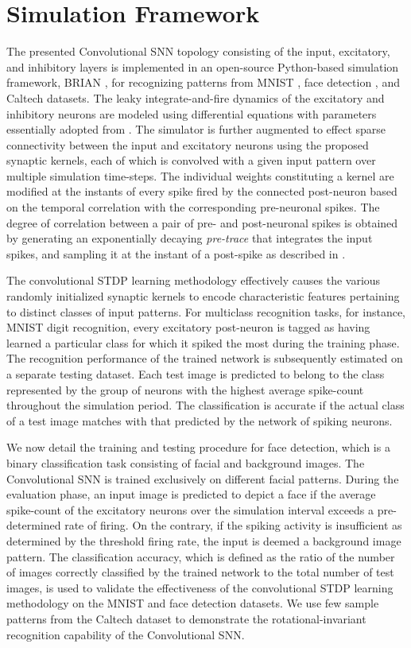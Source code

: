 \documentclass[journal, onecolumn]{IEEEtran}
\begin{document}
\section*{\large\bf{Simulation Framework}}
The presented Convolutional SNN topology consisting of the input, excitatory, and inhibitory layers is implemented in an open-source Python-based simulation framework, BRIAN \cite{goodman2008brian}, for recognizing patterns from MNIST \cite{lecun1998mnist}, face detection \cite{YUV_FACE}, and Caltech \cite{fei2007learning} datasets. The leaky integrate-and-fire dynamics of the excitatory and inhibitory neurons are modeled using differential equations with parameters essentially adopted from \cite{jug2012competition}. The simulator is further augmented to effect sparse connectivity between the input and excitatory neurons using the proposed synaptic kernels, each of which is convolved with a given input pattern over multiple simulation time-steps. The individual weights constituting a kernel are modified at the instants of every spike fired by the connected post-neuron based on the temporal correlation with the corresponding pre-neuronal spikes. The degree of correlation between a pair of pre- and post-neuronal spikes is obtained by generating an exponentially decaying \textit{pre-trace} that integrates the input spikes, and sampling it at the instant of a post-spike as described in \cite{diehl2015unsupervised}.

The convolutional STDP learning methodology effectively causes the various randomly initialized synaptic kernels to encode characteristic features pertaining to distinct classes of input patterns. For multiclass recognition tasks, for instance, MNIST digit recognition, every excitatory post-neuron is tagged as having learned a particular class for which it spiked the most during the training phase. The recognition performance of the trained network is subsequently estimated on a separate testing dataset. Each test image is predicted to belong to the class represented by the group of neurons with the highest average spike-count throughout the simulation period. The classification is accurate if the actual class of a test image matches with that predicted by the network of spiking neurons.

We now detail the training and testing procedure for face detection, which is a binary classification task consisting of facial and background images. The Convolutional SNN is trained exclusively on different facial patterns. During the evaluation phase, an input image is predicted to depict a face if the average spike-count of the excitatory neurons over the simulation interval exceeds a pre-determined rate of firing. On the contrary, if the spiking activity is insufficient as determined by the threshold firing rate, the input is deemed a background image pattern. The classification accuracy, which is defined as the ratio of the number of images correctly classified by the trained network to the total number of test images, is used to validate the effectiveness of the convolutional STDP learning methodology on the MNIST and face detection datasets. We use few sample patterns from the Caltech dataset to demonstrate the rotational-invariant recognition capability of the Convolutional SNN.
\end{document}
